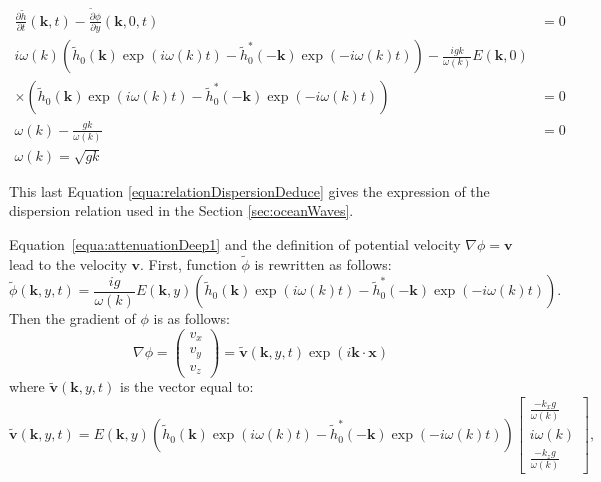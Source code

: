 \documentclass[final]{jcgt}
\begin{document}
\begin{align}
\frac{\partial \tilde{h}}{\partial t}(\mathbf{k},t) - \frac{\tilde{\partial}\phi}{\partial y}(\mathbf{k}, 0, t) &=0 \nonumber\\
i\omega(k)\left(\tilde{h}_0(\mathbf{k})\exp(i\omega(k)t)-\tilde{h}_0^*(-\mathbf{k})\exp(-i\omega(k)t)\right) - \frac{igk}{\omega(k)} E(\mathbf{k},0)\nonumber\\
 \times \left(\tilde{h}_0(\mathbf{k})\exp(i\omega(k)t)-\tilde{h}_0^*(-\mathbf{k})\exp(-i\omega(k)t)\right) &= 0 \nonumber\\
 \omega(k)- \frac{gk}{\omega(k)} &= 0 \nonumber\\
 \omega(k) = \sqrt{gk} \label{equa:relationDispersionDeduce}
\end{align}

This last Equation \ref{equa:relationDispersionDeduce} gives the expression of the dispersion relation used in the Section \ref{sec:oceanWaves}. 

Equation~\ref{equa:attenuationDeep1} and the definition of potential velocity $\nabla\phi=\mathbf{v}$ lead to the velocity $\mathbf{v}$. First, function $\tilde{\phi}$ is rewritten as follows:
\begin{equation}
	\tilde{\phi}(\mathbf{k}, y, t)=\frac{ig}{\omega(k)} E(\mathbf{k},y) \left(\tilde{h}_0(\mathbf{k})\exp(i\omega(k)t)-\tilde{h}_0^*(-\mathbf{k})\exp(-i\omega(k)t)\right).
\end{equation}
Then the gradient of $\phi$ is as follows:
\begin{equation}
	\nabla \phi = \begin{pmatrix}
		v_x \\
		v_y \\
		v_z
	\end{pmatrix} =\tilde{\mathbf{v}}(\mathbf{k}, y, t)\exp\left(i\mathbf{k}\cdot\mathbf{x}\right)
\end{equation}
where $\tilde{\mathbf{v}}(\mathbf{k}, y, t)$ is the vector equal to:
\begin{equation}
	\tilde{\mathbf{v}}\left(\mathbf{k}, y, t\right)=%
	E\left(\mathbf{k},y\right)\left(\tilde{h}_0\left(\mathbf{k}\right)\exp\left({i\omega(k)t}\right)-\tilde{h}_0^*\left(-\mathbf{k}\right)\exp\left({-i\omega(k)t}\right)\right)
	\left[
		\begin{array}{c}
			\displaystyle\frac{-k_xg}{\omega(k)} \\
			\displaystyle i\omega(k)             \\
			\displaystyle\frac{-k_zg}{\omega(k)}
		\end{array}
		\right],
\end{equation}
\end{document}
